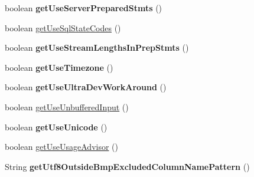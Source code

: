 \begin{DoxyCompactItemize}
\item 
\mbox{\label{classcom_1_1mysql_1_1jdbc_1_1jdbc2_1_1optional_1_1_connection_wrapper_acd495163b946a99a75cc528ab7e08a51}} 
boolean {\bfseries get\+Use\+Server\+Prepared\+Stmts} ()
\item 
boolean \mbox{\hyperlink{classcom_1_1mysql_1_1jdbc_1_1jdbc2_1_1optional_1_1_connection_wrapper_a2edc5b51339d1e377af614a97cc844ad}{get\+Use\+Sql\+State\+Codes}} ()
\item 
\mbox{\label{classcom_1_1mysql_1_1jdbc_1_1jdbc2_1_1optional_1_1_connection_wrapper_a5e53de53d2c912caee8045cbf14c22f4}} 
boolean {\bfseries get\+Use\+Stream\+Lengths\+In\+Prep\+Stmts} ()
\item 
\mbox{\label{classcom_1_1mysql_1_1jdbc_1_1jdbc2_1_1optional_1_1_connection_wrapper_ad9f6d9a7bbfadfadd3ab448e401a0bce}} 
boolean {\bfseries get\+Use\+Timezone} ()
\item 
\mbox{\label{classcom_1_1mysql_1_1jdbc_1_1jdbc2_1_1optional_1_1_connection_wrapper_a69a3882517b2cab2b2b98fd77802d3ed}} 
boolean {\bfseries get\+Use\+Ultra\+Dev\+Work\+Around} ()
\item 
boolean \mbox{\hyperlink{classcom_1_1mysql_1_1jdbc_1_1jdbc2_1_1optional_1_1_connection_wrapper_a3c1db049eb316025a36115fbc35b225f}{get\+Use\+Unbuffered\+Input}} ()
\item 
\mbox{\label{classcom_1_1mysql_1_1jdbc_1_1jdbc2_1_1optional_1_1_connection_wrapper_abb509014eef78df87fc44fa07b57ecff}} 
boolean {\bfseries get\+Use\+Unicode} ()
\item 
boolean \mbox{\hyperlink{classcom_1_1mysql_1_1jdbc_1_1jdbc2_1_1optional_1_1_connection_wrapper_a7d80daca8afe93680ae9cff38bd9e287}{get\+Use\+Usage\+Advisor}} ()
\item 
\mbox{\label{classcom_1_1mysql_1_1jdbc_1_1jdbc2_1_1optional_1_1_connection_wrapper_ae1798176856945360e4e889213cd1372}} 
String {\bfseries get\+Utf8\+Outside\+Bmp\+Excluded\+Column\+Name\+Pattern} ()

\end{DoxyCompactItemize}
